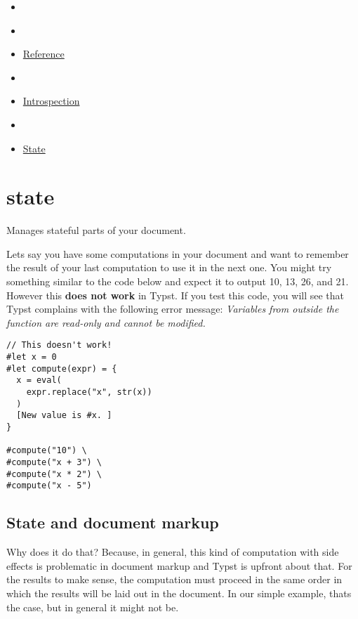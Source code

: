 \begin{itemize}
\tightlist
\item
  \href{/docs}{}
\item
  
\item
  \href{/docs/reference/}{Reference}
\item
  
\item
  \href{/docs/reference/introspection/}{Introspection}
\item
  
\item
  \href{/docs/reference/introspection/state/}{State}
\end{itemize}

\section{\texorpdfstring{{ state }}{ state }}\label{summary}

Manages stateful parts of your document.

Let\textquotesingle s say you have some computations in your document
and want to remember the result of your last computation to use it in
the next one. You might try something similar to the code below and
expect it to output 10, 13, 26, and 21. However this \textbf{does not
work} in Typst. If you test this code, you will see that Typst complains
with the following error message: \emph{Variables from outside the
function are read-only and cannot be modified.}

\begin{verbatim}
// This doesn't work!
#let x = 0
#let compute(expr) = {
  x = eval(
    expr.replace("x", str(x))
  )
  [New value is #x. ]
}

#compute("10") \
#compute("x + 3") \
#compute("x * 2") \
#compute("x - 5")
\end{verbatim}

\subsection{State and document markup}\label{state-and-markup}

Why does it do that? Because, in general, this kind of computation with
side effects is problematic in document markup and Typst is upfront
about that. For the results to make sense, the computation must proceed
in the same order in which the results will be laid out in the document.
In our simple example, that\textquotesingle s the case, but in general
it might not be.

